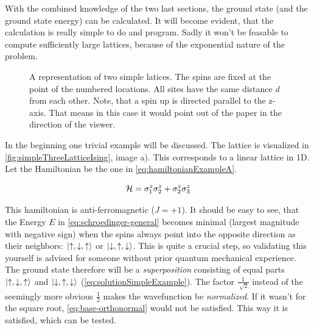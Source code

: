 With the combined knowledge of the two last sections, the ground state (and the ground state energy) can be calculated. It will become evident, that the calculation is really simple to do and program. Sadly it won't be feasable to compute sufficiently large lattices, because of the exponential nature of the problem.

\begin{figure}[htbp]
    \centering
    \vspace{-1cm}
    \caption{A representation of two simple latices. The spins are fixed at the point of the numbered locations. All sites have the same distance $d$ from each other. Note, that a spin up \up is directed parallel to the z-axis. That means in this case it would point out of the paper in the direction of the viewer.}
    \label{fig:simpleThreeLatticeIsing}
\end{figure}

In the beginning one trivial example will be discussed. The lattice is visualized in \autoref{fig:simpleThreeLatticeIsing}, image a).
This corresponds to a linear lattice in 1D. Let the Hamiltonian be the one in \autoref{eq:hamiltonianExampleA}.

\begin{equation}
    \label{eq:hamiltonianExampleA}
    \mathcal{H} = \sigma^z_1\sigma^z_2 + \sigma^z_2\sigma^z_3
\end{equation}

This hamiltonian is anti-ferromagnetic ($J = +1$). It should be easy to see, that the Energy $E$ in \autoref{eq:schroedinger-general} becomes minimal (largest magnitude with negative sign) when the spins always point into the opposite direction as their neighbors: $\ket{\uparrow, \downarrow, \uparrow}$ or $\ket{\downarrow, \uparrow, \downarrow}$. This is quite a crucial step, so validating this yourself is advised for someone without prior quantum mechanical experience.
The ground state therefore will be a \emph{superposition} consisting of equal parts $\ket{\uparrow, \downarrow, \uparrow}$ and $\ket{\downarrow, \uparrow, \downarrow}$ (\autoref{eq:solutionSimpleExample}). The factor $\frac{1}{\sqrt[]{2}}$ instead of the seemingly more obvious $\frac{1}{2}$ makes the wavefunction be \emph{normalized}. If it wasn't for the square root, \autoref{eq:base-orthonormal} would not be satisfied. This way it is satisfied, which can be tested.

